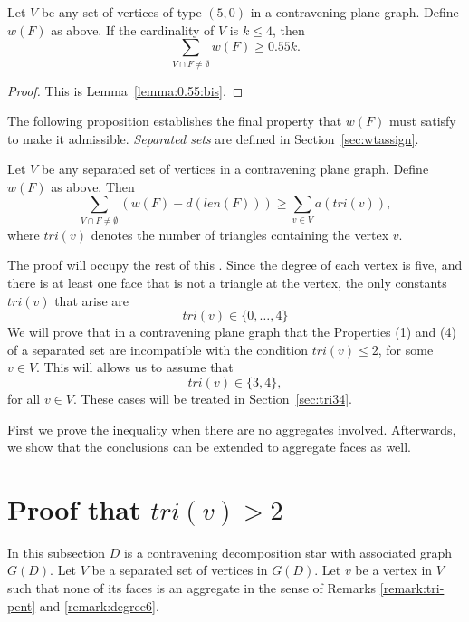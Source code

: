 \begin{lemma} Let $V$ be any set of vertices of type $(5,0)$ in a
contravening plane graph.  Define $w(F)$ as above.
        If the cardinality of $V$ is $k\le 4$,
        then
        $$\sum_{V\cap F\ne\emptyset} w(F) \ge 0.55 k.$$
\end{lemma}

\begin{proof} This is Lemma~\ref{lemma:0.55:bis}.
\end{proof}

The following proposition establishes the final property that
$w(F)$ must satisfy to make it admissible.  {\it Separated sets\/}
are defined in Section~\ref{sec:wtassign}.

\begin{proposition}
        \label{proposition:excess}
        Let $V$ be any separated set 
        of vertices in a contravening plane graph.
        Define $w(F)$ as above.
        Then
        $$\sum_{V\cap F\ne\emptyset} (w(F) -d(len(F)))
            \ge \sum_{v\in V} a(tri(v)),$$
        where $tri(v)$ denotes the number of triangles containing
        the vertex $v$.
\end{proposition}

The proof will occupy the rest of this \chap. Since the degree of
each vertex is five, and there is at least one face that is not a
triangle at the vertex, the only constants $tri(v)$ that arise are
    $$tri(v) \in\{0,\ldots,4\}$$
We will prove that in a contravening plane graph that the
Properties (1) and (4) of a separated set are incompatible with
the condition $tri(v)\le 2$, for some $v\in V$.  This will allows
us to assume that $$tri(v)\in\{3,4\},$$ for all $v\in V$.  These
cases will be treated in Section~\ref{sec:tri34}.


First we prove the inequality when there are no aggregates
involved.  Afterwards, we show that the conclusions can be
extended to aggregate faces as well.

\section{Proof that $tri(v)>2$}
\label{sec:2.4} \label{sec:tri2}

In this subsection $D$ is a contravening decomposition star with
associated graph $G(D)$.  Let $V$ be a separated set of vertices
in $G(D)$. Let $v$ be a vertex in $V$ such that none of its faces
is an aggregate in the sense of Remarks \ref{remark:tri-pent} and
\ref{remark:degree6}.

